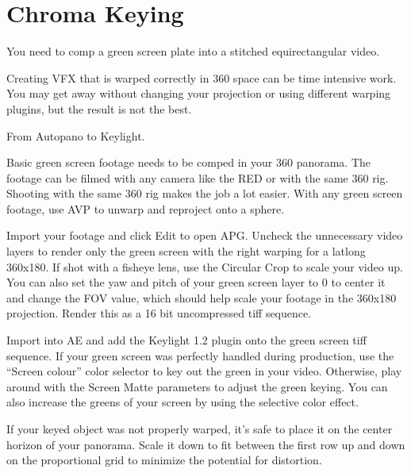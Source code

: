 \chapter{Chroma Keying}
\pagecolor{white}
\label{chap:53}
\begin{fullwidth}

\problem

{\large You need to comp a green screen plate into a stitched equirectangular video. \par}

Creating VFX that is warped correctly in 360 space can be time intensive work. You may get away without changing your projection or using different warping plugins, but the result is not the best. 

\solution

{\large From Autopano to Keylight. \par}

Basic green screen footage needs to be comped in your 360 panorama. The footage can be filmed with any camera like the RED or with the same 360 rig. Shooting with the same 360 rig makes the job a lot easier. With any green screen footage, use AVP to unwarp and reproject onto a sphere. 


Import your footage and click Edit to open APG. Uncheck the unnecessary video layers to render only the green screen with the right warping for a latlong 360x180. If shot with a fisheye lens, use the Circular Crop to scale your video up. You can also set the yaw and pitch of your green screen layer to 0 to center it and change the FOV value, which should help scale your footage in the 360x180 projection. Render this as a 16 bit uncompressed tiff sequence.


Import into AE and add the Keylight 1.2 plugin onto the green screen tiff sequence. If your green screen was perfectly handled during production, use the “Screen colour” color selector to key out the green in your video. Otherwise, play around with the Screen Matte parameters to adjust the green keying. You can also increase the greens of your screen by using the selective color effect.

\clearpage
If your keyed object was not properly warped, it's safe to place it on the center horizon of your panorama. Scale it down to fit between the first row up and down on the proportional grid to minimize the potential for distortion.


\end{fullwidth}
